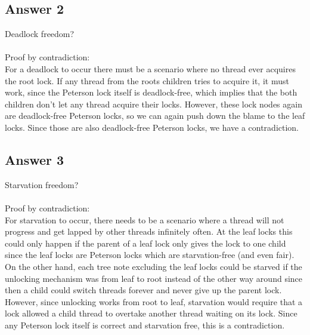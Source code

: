 \documentclass[a4paper,%
11pt,%
DIV=14,
headsepline,%
headings=normal,
]{scrartcl}
\newcommand{\answer}[1]{\subsection*{Answer #1}}
\begin{document}
\answer{2}
Deadlock freedom?\\
\\
Proof by contradiction:\\
For a deadlock to occur there must be a scenario where no thread ever acquires the root lock. If any thread from the roots children tries to acquire it, it must work, since the Peterson lock itself is deadlock-free, which implies that the both children don't let any thread acquire their locks. However, these lock nodes again are deadlock-free Peterson locks, so we can again push down the blame to the leaf locks. Since those are also deadlock-free Peterson locks, we have a contradiction. 

\answer{3}
Starvation freedom?\\
\\
Proof by contradiction:\\
For starvation to occur, there needs to be a scenario where a thread will not progress and get lapped by other threads infinitely often. At the leaf locks this could only happen if the parent of a leaf lock only gives the lock to one child since the leaf locks are Peterson locks which are starvation-free (and even fair). On the other hand, each tree note excluding the leaf locks could be starved if the unlocking mechanism was from leaf to root instead of the other way around since then a child could switch threads forever and never give up the parent lock. However, since unlocking works from root to leaf, starvation would require that a lock allowed a child thread to overtake another thread waiting on its lock. Since any Peterson lock itself is correct and starvation free, this is a contradiction.
\end{document}
